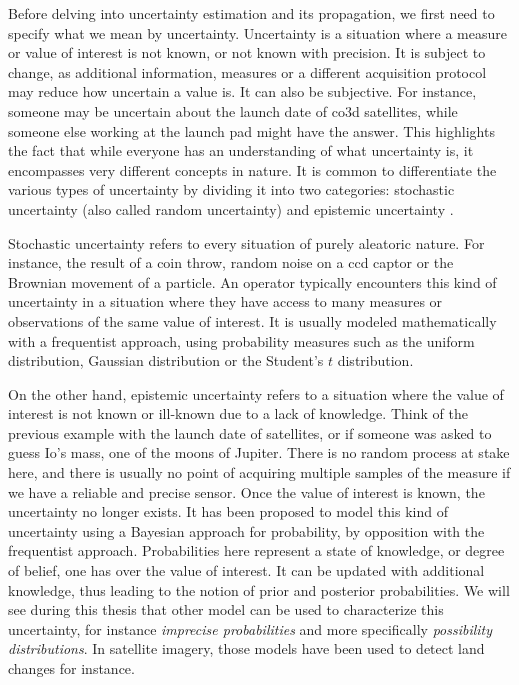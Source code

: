 Before delving into uncertainty estimation and its propagation, we first need to specify what we mean by uncertainty. Uncertainty is a situation where a measure or value of interest is not known, or not known with precision. It is subject to change, as additional information, measures or a different acquisition protocol may reduce how uncertain a value is. It can also be subjective. For instance, someone may be uncertain about the launch date of \acrshort{co3d} satellites, while someone else working at the launch pad might have the answer. This highlights the fact that while everyone has an understanding of what uncertainty is, it encompasses very different concepts in nature. It is common to differentiate the various types of uncertainty by dividing it into two categories: stochastic uncertainty (also called random uncertainty) and epistemic uncertainty \cite{hora_aleatory_1996,frank_treatment_1999}.

Stochastic uncertainty refers to every situation of purely aleatoric nature. For instance, the result of a coin throw, random noise on a \acrshort{ccd} captor or the Brownian movement of a particle. An operator typically encounters this kind of uncertainty in a situation where they have access to many measures or observations of the same value of interest. It is usually modeled mathematically with a frequentist approach, using probability measures such as the uniform distribution, Gaussian distribution or the Student's $t$ distribution.

On the other hand, epistemic uncertainty refers to a situation where the value of interest is not known or ill-known due to a lack of knowledge. Think of the previous example with the launch date of satellites, or if someone was asked to guess Io's mass, one of the moons of Jupiter. There is no random process at stake here, and there is usually no point of acquiring multiple samples of the measure if we have a reliable and precise sensor. Once the value of interest is known, the uncertainty no longer exists. It has been proposed to model this kind of uncertainty using a Bayesian approach for probability, by opposition with the frequentist approach. Probabilities here represent a state of knowledge, or degree of belief, one has over the value of interest. It can be updated with additional knowledge, thus leading to the notion of prior and posterior probabilities. We will see during this thesis that other model can be used to characterize this uncertainty, for instance \textit{imprecise probabilities} and more specifically \textit{possibility distributions}. In satellite imagery, those models have been used to detect land changes \cite{lesniewska-choquet_specialite_2020} for instance.

